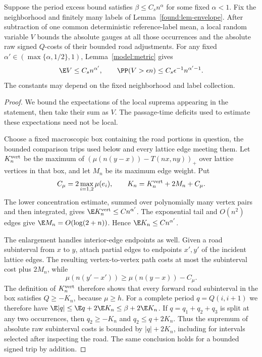 \begin{lemma}
\label{found:lem-gauge-tail}
Suppose the period excess bound satisfies $\beta\leq C_s n^\alpha$
for some fixed $\alpha<1$.  Fix the neighborhood and finitely many
labels of Lemma~\ref{found:lem-envelope}.  After subtraction of one
common deterministic reference-label mean, a local random variable $V$ bounds the
absolute gauges at all those occurrences and the absolute raw signed
$Q$-costs of their bounded road adjustments.  For any fixed
$\alpha'\in(\max\{\alpha,1/2\},1)$, Lemma~\ref{model:metric} gives
\[
 \E V\leq C_s n^{\alpha'},\qquad
 \PP (V>\epsilon n)\leq C_s\epsilon^{-1}n^{\alpha'-1}.
\]
The constants may depend on the fixed neighborhood and label collection.
\end{lemma}

\begin{proof}
We bound the expectations of the local suprema appearing in the
statement, then take their sum as $V$.  The passage-time deficits
used to estimate these expectations need not be local.

Choose a fixed macroscopic box containing the road portions in question,
the bounded comparison trips used below and every lattice edge meeting
them.  Let $K_n^{\rm vert}$ be the
maximum of $(\mu(n(y-x))-T(nx,ny))_+$ over lattice vertices in that
box, and let $M_n$ be its maximum edge weight.  Put
\[
 C_\mu=2\max_{i=1,2}\mu(e_i),\qquad
 K_n=K_n^{\rm vert}+2M_n+C_\mu.
\]
The lower concentration estimate, summed over polynomially many
vertex pairs and then integrated, gives
$\E K_n^{\rm vert}\le C n^{\alpha'}$.  The exponential tail
and $O(n^2)$ edges give $\E M_n=O(\log(2+n))$.  Hence
$\E K_n\le Cn^{\alpha'}$.

The enlargement handles interior-edge endpoints as well.  Given a
road subinterval from $x$ to $y$, attach partial edges to endpoints
$x',y'$ of the incident lattice edges.  The resulting vertex-to-vertex
path costs at most the subinterval cost plus $2M_n$, while
\[
 \mu(n(y'-x'))\geq\mu(n(y-x))-C_\mu.
\]
The definition of $K_n^{\rm vert}$ therefore shows that every forward
road subinterval in the box satisfies $Q\geq-K_n$, because $\mu\geq h$.
For a complete period $q=Q(i,i+1)$ we therefore have
$\E |q|\leq\E q+2\E K_n
\leq\beta+2\E K_n$.
If $q=q_1+q_2+q_3$ is split at any two occurrences, then
$q_2\geq-K_n$ and $q_2\leq q+2K_n$.
Thus the supremum of absolute raw subinterval costs is bounded by
$|q|+2K_n$, including for intervals selected after inspecting the road.
The same conclusion holds for a bounded signed trip by addition.


\end{proof}
